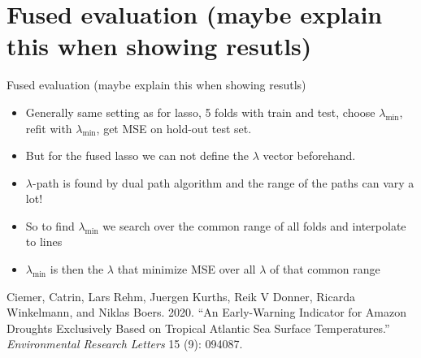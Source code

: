 \documentclass[
  ignorenonframetext,
]{beamer}
\providecommand{\tightlist}{%
  \setlength{\itemsep}{0pt}\setlength{\parskip}{0pt}}
\newlength{\cslhangindent}
\newlength{\cslentryspacingunit} %
\newenvironment{CSLReferences}[2] %
 {%
  \setlength{\parindent}{0pt}
  \ifodd #1
  \let\oldpar\par
  \def\par{\hangindent=\cslhangindent\oldpar}
  \fi
  \setlength{\parskip}{#2\cslentryspacingunit}
 }%
 {}
\begin{document}
\hypertarget{fused-evaluation-maybe-explain-this-when-showing-resutls-1}{%
\section{Fused evaluation (maybe explain this when showing
resutls)}\label{fused-evaluation-maybe-explain-this-when-showing-resutls-1}}

\begin{frame}{Fused evaluation (maybe explain this when showing
resutls)}
\begin{itemize}
\tightlist
\item
  Generally same setting as for lasso, 5 folds with train and test,
  choose \(\lambda_{\min}\), refit with \(\lambda_{\min}\), get MSE on
  hold-out test set.
\item
  But for the fused lasso we can not define the \(\lambda\) vector
  beforehand.
\item
  \(\lambda\)-path is found by dual path algorithm and the range of the
  paths can vary a lot!
\item
  So to find \(\lambda_{\min}\) we search over the common range of all
  folds and interpolate to lines
\item
  \(\lambda_{\min}\) is then the \(\lambda\) that minimize MSE over all
  \(\lambda\) of that common range
\end{itemize}

\hypertarget{refs}{}
\begin{CSLReferences}{1}{0}
\leavevmode{}%
Ciemer, Catrin, Lars Rehm, Juergen Kurths, Reik V Donner, Ricarda
Winkelmann, and Niklas Boers. 2020. {``An Early-Warning Indicator for
Amazon Droughts Exclusively Based on Tropical Atlantic Sea Surface
Temperatures.''} \emph{Environmental Research Letters} 15 (9): 094087.

\end{CSLReferences}
\end{frame}
\end{document}
